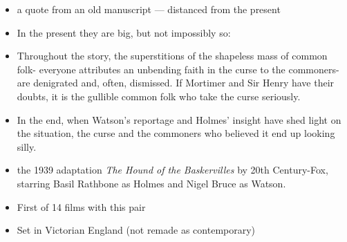 \documentclass[a4paper,landscape,headrule,footrule,xetex]{foils}
\begin{document}
\newpage
\begin{quotation}
\end{quotation}
\begin{itemize}
\item a quote from an old manuscript --- distanced from the present
\item In the present they are big, but not impossibly so: 
\\ 

\end{itemize}

\begin{itemize}
\item 
Throughout the story, the superstitions of the shapeless mass of
common folk- everyone attributes an unbending faith in the curse to
the commoners-are denigrated and, often, dismissed. If Mortimer and
Sir Henry have their doubts, it is the gullible common folk who take
the curse seriously. 
\item In the end, when Watson's reportage and Holmes'
insight have shed light on the situation, the curse and the commoners
who believed it end up looking silly.
\end{itemize}

\begin{itemize}
\item the 1939 adaptation \textit{The Hound of the
    Baskervilles} by 20th Century-Fox, starring Basil Rathbone as
  Holmes and Nigel Bruce as Watson.
\item First of 14 films with this pair
\item Set in Victorian England (not remade as contemporary)

\end{itemize}
\end{document}
